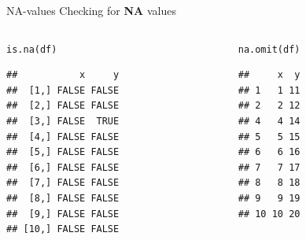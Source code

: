 \documentclass[xcolor=table,       handout,    xcolor=dvipsnames]{beamer}\usepackage[]{graphicx}\usepackage[]{color}
\makeatletter
\newcommand{\hlnum}[1]{\textcolor[rgb]{0,0,0}{#1}}
\newcommand{\hlstr}[1]{\textcolor[rgb]{0.545,0.137,0.137}{#1}}
\newcommand{\hlopt}[1]{\textcolor[rgb]{0,0,0}{#1}}
\newcommand{\hlstd}[1]{\textcolor[rgb]{0,0,0}{#1}}
\newcommand{\hlkwc}[1]{\textcolor[rgb]{1,0,1}{#1}}
\newcommand{\hlkwd}[1]{\textcolor[rgb]{0,0,1}{#1}}
\newenvironment{kframe}{%
 \def\at@end@of@kframe{}%
 \ifinner\ifhmode%
  \def\at@end@of@kframe{\end{minipage}}%
  \begin{minipage}{\columnwidth}%
 \fi\fi%
 \def\FrameCommand##1{\hskip\@totalleftmargin \hskip-\fboxsep
 \colorbox{shadecolor}{##1}\hskip-\fboxsep
     \hskip-\linewidth \hskip-\@totalleftmargin \hskip\columnwidth}%
 \MakeFramed {\advance\hsize-\width
   \@totalleftmargin\z@ \linewidth\hsize
   \@setminipage}}%
 {\par\unskip\endMakeFramed%
 \at@end@of@kframe}
\newenvironment{knitrout}{}{} %
\makeatother
\begin{document}



\begin{frame}[fragile]{NA-values}
	Checking for \textbf{NA} values
	\begin{columns}
	\begin{column}{.48\textwidth}

\begin{knitrout}
\color{fgcolor}\begin{kframe}
\begin{alltt}
\hlkwd{is.na}\hlstd{(df)}
\end{alltt}
\begin{verbatim}
##           x     y
##  [1,] FALSE FALSE
##  [2,] FALSE FALSE
##  [3,] FALSE  TRUE
##  [4,] FALSE FALSE
##  [5,] FALSE FALSE
##  [6,] FALSE FALSE
##  [7,] FALSE FALSE
##  [8,] FALSE FALSE
##  [9,] FALSE FALSE
## [10,] FALSE FALSE
\end{verbatim}
\end{kframe}
\end{knitrout}
	\end{column}
	\hfill
	\pause
	\begin{column}{.48\textwidth}
\begin{knitrout}
\color{fgcolor}\begin{kframe}
\begin{alltt}
\hlkwd{na.omit}\hlstd{(df)}
\end{alltt}
\begin{verbatim}
##     x  y
## 1   1 11
## 2   2 12
## 4   4 14
## 5   5 15
## 6   6 16
## 7   7 17
## 8   8 18
## 9   9 19
## 10 10 20
\end{verbatim}
\end{kframe}
\end{knitrout}
	\end{column}
	\end{columns}
\end{frame}
\end{document}
